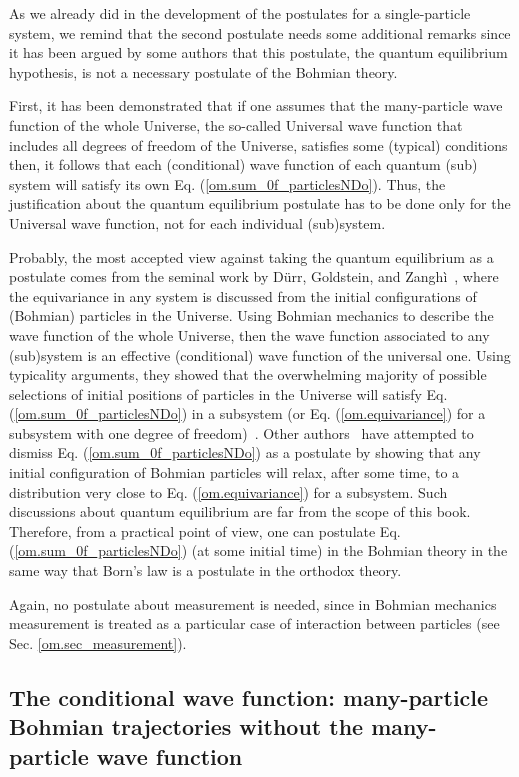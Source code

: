 \documentclass[nofootinbib, secnumarabic, amsmath, nobibnotes,11pt,aps,pra, floatfix]{revtex4-1}
\newcommand{\sref}[1]{Sec. \ref{#1}}
\newcommand{\eref}[1]{Eq. (\ref{#1})}
\begin{document}
As we  already did in the development of the postulates for a single-particle system, we remind that the second postulate needs some additional remarks since it has been argued by some authors that this postulate, the quantum equilibrium hypothesis, is not a necessary postulate of the Bohmian theory. 

First, it has been demonstrated that if one assumes that the many-particle wave function of the whole Universe, the so-called Universal wave function that includes all degrees of freedom of the Universe, satisfies some (typical) conditions then, it follows that each (conditional) wave function of each quantum (sub) system will satisfy its own \eref{om.sum_0f_particlesNDo}. Thus, the justification about the quantum equilibrium postulate has to be done only for the Universal wave function, not for each individual (sub)system.  

Probably, the most accepted view against taking the quantum equilibrium as a postulate comes from the seminal work by D\"urr, Goldstein, and Zangh\`i~\cite{om.extra9,om.llibreph}, where the equivariance in any system is discussed from the initial configurations of (Bohmian) particles in the Universe.
Using Bohmian mechanics to describe the wave function of the whole Universe, then the wave function associated to any (sub)system is an effective (conditional) wave function of the universal one. Using typicality arguments, they showed that the overwhelming majority of possible selections of initial positions of particles in the Universe will satisfy  \eref{om.sum_0f_particlesNDo} in a subsystem (or \eref{om.equivariance} for a subsystem with one degree of freedom)~\cite{om.extra9,om.llibreph}.
Other authors~\cite{om.towler2011} have attempted to dismiss \eref{om.sum_0f_particlesNDo} as a postulate by showing that any initial configuration of Bohmian particles will relax, after some time, to a distribution very close to \eref{om.equivariance} for a subsystem.
Such discussions about quantum equilibrium are far from the scope of this book. Therefore, from a practical point of view, one can postulate \eref{om.sum_0f_particlesNDo} (at some initial time) in the Bohmian theory in the same way that Born's law is a postulate in the orthodox theory.
 

Again, no postulate about measurement is needed, since in Bohmian
mechanics measurement is treated as a particular case of interaction between particles (see \sref{om.sec_measurement}).

\subsection{The conditional wave function: many-particle Bohmian trajectories without the many-particle wave function}\label{om.sec_many.6}
\end{document}
